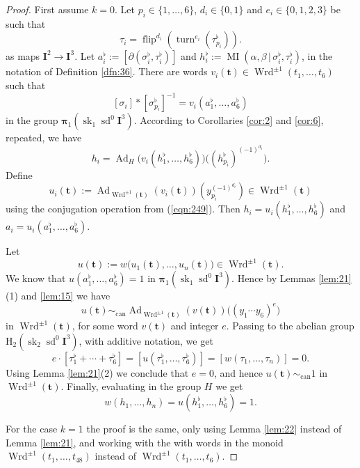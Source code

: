 \documentclass[10pt, a4paper]{amsart}
\theoremstyle{definition}
\numberwithin{equation}{section}
\newcommand{\opn}{\operatorname}
\newcommand{\mbf}[1]{\mathbf{#1}}
\newcommand{\mrm}[1]{\mathrm{#1}}
\newcommand{\bsym}[1]{\boldsymbol{#1}}
\renewcommand{\vert}{\, | \,}
\begin{document}
\begin{proof}
First assume $k = 0$. Let $p_i \in \{ 1, \ldots, 6 \}$, 
$d_i \in \{ 0, 1 \}$ and $e_i \in \{ 0, 1, 2, 3 \}$ be such that
\[ \tau_i = \opn{flip}^{d_i} ( \opn{turn}^{e_i} (\tau^{\flat}_{p_i} )) . \]
as maps $\mbf{I}^2 \to \mbf{I}^3$.
Let
$a^{\flat}_i := [\partial (\sigma^{\flat}_{i}, \tau^{\flat}_{i})]$
and
$h^{\flat}_i := \opn{MI} (\alpha, \beta \vert \sigma^{\flat}_i,
\tau^{\flat}_i)$,
in the notation of Definition \ref{dfn:36}. There are words 
$v_i(\bsym{t}) \in \opn{Wrd}^{\pm 1}(t_1, \ldots, t_6)$
such that 
\[ [\sigma_i] * [\sigma^{\flat}_{p_i}]^{-1} = 
v_i(a^{\flat}_1, \ldots, a^{\flat}_6) \]
in the group 
$\bsym{\pi}_1(\opn{sk}_1 \opn{sd}^0 \mbf{I}^3)$.
According to Corollaries \ref{cor:2} and \ref{cor:6}, repeated, we have
\[ h_i = \opn{Ad}_H \bigl( v_i( h^{\flat}_1, \ldots, h^{\flat}_6 ) \bigr)
\bigl( (h^{\flat}_{p_i})^{(-1)^{d_i}} \bigr) . \]
Define
\[ u_i(\bsym{t}) := \opn{Ad}_{\opn{Wrd}^{\pm 1}(\bsym{t})}( v_i(\bsym{t}))
(y_{p_i}^{(-1)^{d_i}}) \in \opn{Wrd}^{\pm 1}(\bsym{t})  \]
using the conjugation operation from (\ref{eqn:249}). Then
$h_i = u_i(h^{\flat}_1, \ldots, h^{\flat}_6)$ and
$a_i = u_i(a^{\flat}_1, \ldots, a^{\flat}_6)$.

Let 
\[ u(\bsym{t}) := w \bigl( u_1(\bsym{t}), \ldots, u_n(\bsym{t}) \bigr) 
\in \opn{Wrd}^{\pm 1}(\bsym{t}) . \]
We know that
$u(a^{\flat}_1, \ldots, a^{\flat}_6) = 1$ in 
$\bsym{\pi}_1(\opn{sk}_1 \opn{sd}^0 \mbf{I}^3)$.
Hence by Lemmas \ref{lem:21}(1) and \ref{lem:15} we have
\[ u(\bsym{t}) \sim_{\mrm{can}} 
\opn{Ad}_{\opn{Wrd}^{\pm 1}(\bsym{t})} (v(\bsym{t})) \bigl( (y_1 \cdots y_6)^e 
\bigr)
\]
in $\opn{Wrd}^{\pm 1}(\bsym{t})$, for some word $v(\bsym{t})$ and integer $e$. 
Passing to the abelian group \linebreak 
$\mrm{H}_2(\opn{sk}_2 \opn{sd}^0 \mbf{I}^3)$, with additive notation, 
we get
\[ e \cdot [\tau^{\flat}_{1} + \cdots + \tau^{\flat}_{6}] = 
[u(\tau^{\flat}_{1} , \ldots , \tau^{\flat}_{6})] =
[w(\tau_1, \ldots, \tau_n)] = 0 . \]
Using Lemma \ref{lem:21}(2) we conclude that $e = 0$, and hence
$u(\bsym{t}) \sim_{\mrm{can}} 1$ in $\opn{Wrd}^{\pm 1}(\bsym{t})$.
Finally, evaluating in the group $H$ we get
\[ w(h_1, \ldots, h_n) = u(h^{\flat}_1, \ldots, h^{\flat}_6) = 1 . \]

For the case $k = 1$ the proof is the same, only using Lemma \ref{lem:22}
instead of Lemma \ref{lem:21}, and working with the  with words in the  monoid
$\opn{Wrd}^{\pm 1}(t_1, \ldots, t_{48})$ instead of 
$\opn{Wrd}^{\pm 1}(t_1, \ldots, t_{6})$.
\end{proof}
\end{document}
